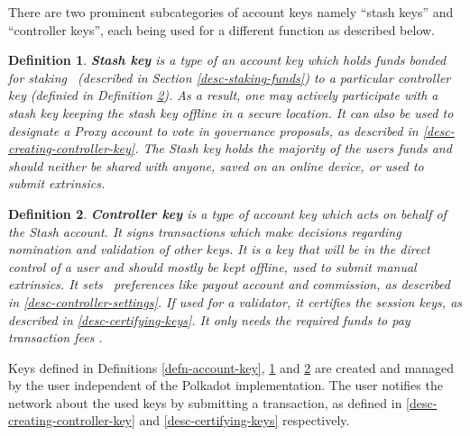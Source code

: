 \documentclass{book}
\newcommand{\tmstrong}[1]{\textbf{#1}}
\newcommand{\tmtextbf}[1]{{\bfseries{#1}}}
\newtheorem{definition}{Definition}
\providecommand{\tmstrong}[1]{\tmtextbf{#1}}
\providecommand{\tmtextbf}[1]{\tmtextbf{#1}}
\newtheorem{definition}{Definition}
\begin{document}
There are two prominent subcategories of account keys namely ``stash keys''
and ``controller keys'', each being used for a different function as described
below.

\begin{definition}
  \label{defn-stash-key}{\tmstrong{Stash key}} is a type of an account key
  which holds funds bonded for staking \ (described in Section
  \ref{desc-staking-funds}) to a particular controller key (definied in
  Definition \ref{defn-controller-key}). As a result, one may actively
  participate with a stash key keeping the stash key offline in a secure
  location. It can also be used to designate a Proxy account to vote in
  governance proposals, as described in \ref{desc-creating-controller-key}.
  The Stash key holds the majority of the users funds and should neither be
  shared with anyone, saved on an online device, or used to submit extrinsics.
\end{definition}

\begin{definition}
  \label{defn-controller-key}{\tmstrong{Controller key}} is a type of account
  key which acts on behalf of the Stash account. It signs transactions which
  make decisions regarding nomination and validation of other keys. It is a
  key that will be in the direct control of a user and should mostly be kept
  offline, used to submit manual extrinsics. It sets \ preferences like payout
  account and commission, as described in \ref{desc-controller-settings}. If
  used for a validator, it certifies the session keys, as described in
  \ref{desc-certifying-keys}. It only needs the required funds to pay
  transaction fees {}.
\end{definition}

Keys defined in Definitions \ref{defn-account-key}, \ref{defn-stash-key} and
\ref{defn-controller-key} are created and managed by the user independent of
the Polkadot implementation. The user notifies the network about the used keys
by submitting a transaction, as defined in \ref{desc-creating-controller-key}
and \ref{desc-certifying-keys} respectively.
\end{document}
